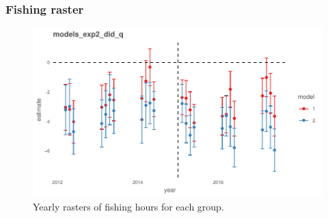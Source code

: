 \documentclass[11pt,english]{article}
\begin{document}
\hypertarget{fishing-raster}{%
\subsubsection{Fishing raster}\label{fishing-raster}}

\begin{figure}
\centering
\includegraphics{Manuscript_files/figure-latex/unnamed-chunk-32-1.pdf}
\caption{\label{fig:unnamed-chunk-32}\label{fig:fishing_raster_full}Yearly
rasters of fishing hours for each group.}
\end{figure}

\clearpage
\end{document}
